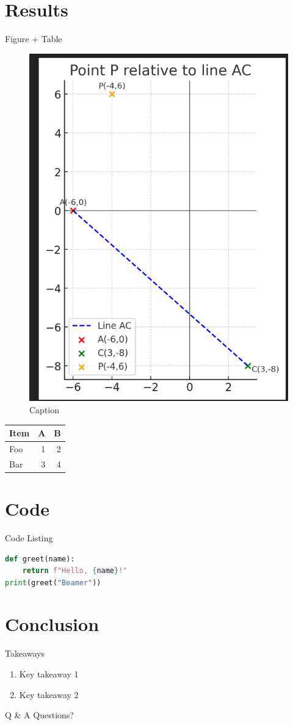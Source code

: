 \documentclass[aspectratio=169,11pt]{beamer}
\begin{document}
\section{Results}
\begin{frame}{Figure + Table}
    \begin{figure}
        \centering
        \includegraphics[width=0.3\linewidth]{Fig1.png}
        \caption{Caption}
        \label{fig:placeholder}
    \end{figure}
  \begin{minipage}{0.4\textwidth}
    \begin{tabular}{lrr}
      \toprule
      Item & A & B \\
      \midrule
      Foo  & 1 & 2 \\
      Bar  & 3 & 4 \\
      \bottomrule
    \end{tabular}
  \end{minipage}
\end{frame}


\section{Code}
\begin{frame}[fragile]{Code Listing}
\begin{lstlisting}[language=Python,basicstyle=\ttfamily\small,frame=single]
def greet(name):
    return f"Hello, {name}!"
print(greet("Beamer"))
\end{lstlisting}
\end{frame}

\section{Conclusion}
\begin{frame}{Takeaways}
  \begin{enumerate}
    \item Key takeaway 1
    \item Key takeaway 2
  \end{enumerate}
\end{frame}

\begin{frame}{Q \& A}
  \centering
  \Huge Questions?
\end{frame}
\end{document}
